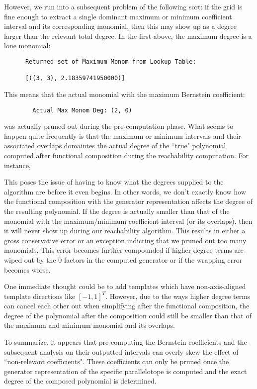 However, we run into a subsequent problem of the following sort: if the grid is fine enough to extract a single dominant maximum or minimum coefficient interval and its corresponding monomial, then this may show up as a degree larger than the relevant total degree. In the first above, the maximum degree is a lone monomial:
%
\begin{verbatim}
      Returned set of Maximum Monom from Lookup Table:

      [((3, 3), 2.18359741950000)]
\end{verbatim}
%
This means that the actual monomial with the maximum Bernstein coefficient:
\begin{verbatim}
        Actual Max Monom Deg: (2, 0)
\end{verbatim}
%
was actually pruned out during the pre-computation phase.
%
What seems to happen quite frequently is that the maximum or minimum intervals and their associated overlaps domaintes the actual degree of the ``true" polynomial computed after functional composition during the reachability computation. For instance,

This poses the issue of having to know what the degrees supplied to the algorithm are before it even begins. In other words, we don't exactly know how the functional composition with the generator representation affects the degree of the resulting polynomial. If the degree is actually smaller than that of the monomial with the maximum/minimum coefficient interval (or its overlaps), then it will never show up during our reachability algorithm. This results in either a gross conservative error or an exception indicting that we pruned out too many monomials.
%
This error becomes further compounded if higher degree terms are wiped out by the 0 factors in the computed generator or if the wrapping error becomes worse.

One immediate thought could be to add templates which have non-axis-aligned template directions like $[-1,1]^T$. However, due to the ways higher degree terms can cancel each other out when simplifying after the functional composition, the degree of the polynomial after the composition could still be smaller than that of the maximum and minimum monomial and its overlaps.

To summarize, it appears that pre-computing the Bernstein coefficients and the subsequent analysis on their outputted intervals can overly skew the effect of ``non-relevant coefficients". These coefficients can only be pruned once the generator representation of the specific parallelotope is computed and the exact degree of the composed polynomial is determined.

